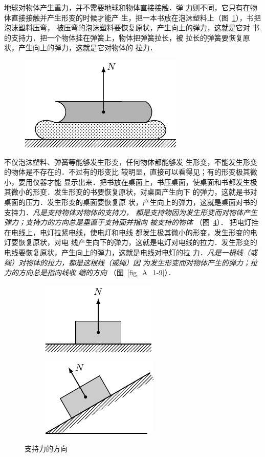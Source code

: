     地球对物体产生重力，并不需要地球和物体直接接触．弹
力则不同，它只有在物体直接接触并产生形变的时候才能产
生，把一本书放在泡沫塑料上（图~\ref{fig_A_1-7}），书把泡沫塑料压弯，
被压弯的泡沫塑料要恢复原状，产生向上的弹力，这就是它对
书的支持力．把一个物体挂在弹簧上，物体把弹簧拉长，被
拉长的弹簧要恢复原状，产生向上的弹力，这就是它对物体的
拉力．
\begin{figure} [htp]
\centering
\includegraphics{fig/A/1-7.pdf} 
\caption{} \label{fig_A_1-7} 
\end{figure} 

    不仅泡沫塑料、弹簧等能够发生形变，任何物体都能够发
生形变，不能发生形变的物体是不存在的．不过有的形变比
较明显，直接可以看得见；有的形变极其微小，要用仪器才能
显示出来．把书放在桌面上，书压桌面，使桌面和书都发生极
其微小的形变．发生形变的书要恢复原状，对桌面产生向下
的弹力，这就是书对桌面的压力．发生形变的桌面要恢复原
状，产生向上的弹力，这就是桌面对书的支持力．\textit{凡是支持物体对物体的支持力，
都是支持物因为发生形变而对物体产生弹力；支持力的方向总是垂直于支持面并指向
被支持的物体} （图~\ref{fig_A_1-8}）．
把电灯挂在电线上，电灯拉紧电线，使电灯和电线
都发生极其微小的形变，发生形变的电灯要恢复原状，对电
线产生向下的弹力，这就是电灯对电线的拉力．发生形变的
电线要恢复原状，产生向上的弹力，这就是电线对电灯的拉
力．\textit{凡是一根线（或绳）对物体的拉力，都是这根线（或绳）因
为发生形变而对物体产生的弹力；拉力的方向总是指向线收
缩的方向} （图~\ref{fig_A_1-9}）．

\begin{figure} [htp]\centering
	\begin{subfigure} {0.46\linewidth} 
		\centering
		\includegraphics{fig/A/1-8a.pdf} 
		\caption{} \label{fig_A_1-8a} 
	\end{subfigure} 
	\hfil
\begin{subfigure} {0.46\linewidth} 
	\centering
	\includegraphics{fig/A/1-8b.pdf} 
	\caption{} \label{fig_A_1-8b} 
\end{subfigure} 
\caption{支持力的方向} \label{fig_A_1-8} 
\end{figure} 

